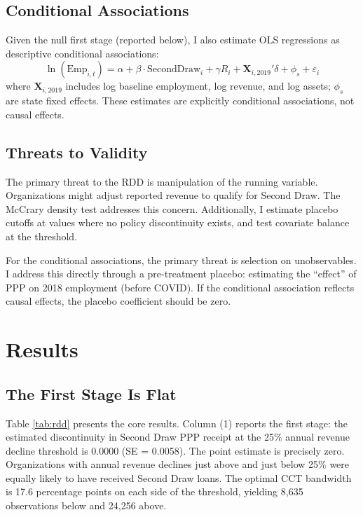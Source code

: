 \documentclass[12pt]{article}
\begin{document}
\subsection{Conditional Associations}

Given the null first stage (reported below), I also estimate OLS regressions as descriptive conditional associations:
\begin{equation}
\ln(\text{Emp}_{i,t}) = \alpha + \beta \cdot \text{SecondDraw}_i + \gamma R_i + \mathbf{X}_{i,2019}'\delta + \phi_s + \varepsilon_i
\end{equation}
where $\mathbf{X}_{i,2019}$ includes log baseline employment, log revenue, and log assets; $\phi_s$ are state fixed effects. These estimates are explicitly conditional associations, not causal effects.

\subsection{Threats to Validity}

The primary threat to the RDD is manipulation of the running variable. Organizations might adjust reported revenue to qualify for Second Draw. The McCrary density test addresses this concern. Additionally, I estimate placebo cutoffs at values where no policy discontinuity exists, and test covariate balance at the threshold.

For the conditional associations, the primary threat is selection on unobservables. I address this directly through a pre-treatment placebo: estimating the ``effect'' of PPP on 2018 employment (before COVID). If the conditional association reflects causal effects, the placebo coefficient should be zero.


\section{Results}

\subsection{The First Stage Is Flat}



Table \ref{tab:rdd} presents the core results. Column (1) reports the first stage: the estimated discontinuity in Second Draw PPP receipt at the 25\% annual revenue decline threshold is 0.0000 (SE = 0.0058). The point estimate is precisely zero. Organizations with annual revenue declines just above and just below 25\% were equally likely to have received Second Draw loans. The optimal CCT bandwidth is 17.6 percentage points on each side of the threshold, yielding 8,635 observations below and 24,256 above.
\end{document}

